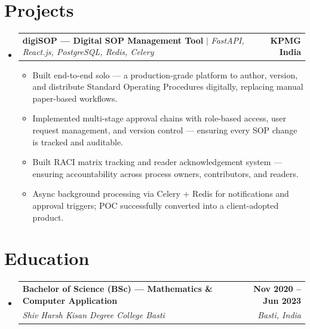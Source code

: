 \documentclass[letterpaper,11pt]{article}
\makeatletter
\newcommand{\resumeItem}[1]{
  \item\small{
    {#1 \vspace{-2pt}}
  }
}
\newcommand{\resumeSubheading}[4]{
  \vspace{-2pt}\item
    \begin{tabular*}{1.0\textwidth}[t]{l@{\extracolsep{\fill}}r}
      \textbf{#1} & \textbf{\small #2} \\
      \textit{\small#3} & \textit{\small #4} \\
    \end{tabular*}\vspace{-7pt}
}
\newcommand{\resumeProjectHeading}[2]{
    \item
    \begin{tabular*}{1.001\textwidth}{l@{\extracolsep{\fill}}r}
      \small#1 & \textbf{\small #2}\\
    \end{tabular*}\vspace{-7pt}
}
\newcommand{\resumeSubHeadingListStart}{\begin{itemize}[leftmargin=0.0in, label={}]}
\newcommand{\resumeSubHeadingListEnd}{\end{itemize}}
\newcommand{\resumeItemListStart}{\begin{itemize}}
\newcommand{\resumeItemListEnd}{\end{itemize}\vspace{-5pt}}
\makeatother
\begin{document}
\vspace{-14pt}
\section{Projects}
  \resumeSubHeadingListStart
    \resumeProjectHeading
      {\textbf{digiSOP — Digital SOP Management Tool} $|$ \emph{FastAPI, React.js, PostgreSQL, Redis, Celery}}{KPMG India}
      \resumeItemListStart
        \resumeItem{Built end-to-end solo — a production-grade platform to author, version, and distribute Standard Operating Procedures digitally, replacing manual paper-based workflows.}
        \resumeItem{Implemented multi-stage approval chains with role-based access, user request management, and version control — ensuring every SOP change is tracked and auditable.}
        \resumeItem{Built RACI matrix tracking and reader acknowledgement system — ensuring accountability across process owners, contributors, and readers.}
        \resumeItem{Async background processing via Celery + Redis for notifications and approval triggers; POC successfully converted into a client-adopted product.}
      \resumeItemListEnd
  \resumeSubHeadingListEnd

\vspace{-10pt}
\section{Education}
  \resumeSubHeadingListStart
    \resumeSubheading
      {Bachelor of Science (BSc) — Mathematics \& Computer Application}{Nov 2020 -- Jun 2023}
      {Shiv Harsh Kisan Degree College Basti}{Basti, India}
  \resumeSubHeadingListEnd
\vspace{0pt}
\end{document}
